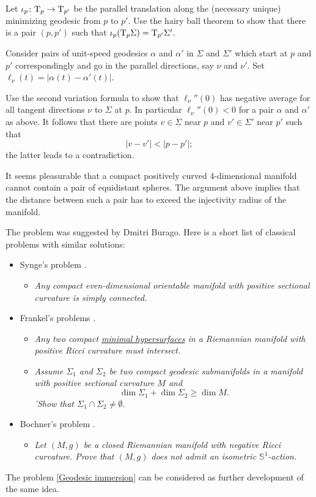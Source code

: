 Let $\iota_p\colon\mathrm{T}_p\to\mathrm{T}_{p'}$ be the parallel translation along the (necessary unique) minimizing geodesic from $p$ to $p'$.
Use the hairy ball theorem 
to show that there is a pair $(p,p')$ such that $\iota_p(\mathrm{T}_p\Sigma)=\mathrm{T}_{p'}\Sigma'$.

Consider pairs of unit-speed geodesics $\alpha$ and $\alpha'$ 
in $\Sigma$ and $\Sigma'$  
which start at $p$ and $p'$ correspondingly
and go in the parallel directions, say $\nu$ and $\nu'$. 
Set $\ell_\nu(t)=|\alpha(t)-\alpha'(t)|$.

Use the second variation formula to show that $\ell_\nu''(0)$ has negative average for all tangent directions $\nu$ to $\Sigma$ at $p$. 
In particular $\ell_\nu''(0)<0$ for a pair $\alpha$ and $\alpha'$ as above.
It follows that there are points $v\in\Sigma$ near $p$ 
and $v'\in\Sigma'$ near $p'$
such that 
\[|v-v'|<|p-p'|;\]
the latter leads to a contradiction.

It seems pleasurable that a 
compact 
positively curved 
4-dimensional manifold
cannot contain a pair of equidistant spheres.
The argument above implies that the distance between such a pair has to exceed the injectivity radius of the manifold.

{\sloppy 
The problem was suggested by Dmitri Burago.
Here is a short list of classical problems with similar solutions:
\begin{itemize}
\item Synge's problem \cite[see][]{synge}.
\begin{itemize}
 \item {\it Any compact even-dimensional orientable manifold with positive sectional curvature is
simply connected.}
\end{itemize}
\item Frankel's problems \cite[see][]{frankel}.
\begin{itemize}
\item {\it Any two compact \hyperref[Minimal surface]{\emph{minimal hypersurfaces}} in a Riemannian manifold with positive Ricci curvature must intersect.}
\item {\it Assume $\Sigma_1$ and $\Sigma_2$ be two compact geodesic submanifolds in a manifold with positive sectional curvature $M$ and \[\dim \Sigma_1+\dim \Sigma_2\ge \dim M.\] 'Show that $\Sigma_1\cap\Sigma_2\ne\emptyset$.}
\end{itemize}
\item Bochner's problem \cite[see][]{bochner}.
\begin{itemize}
\item{\it  Let $(M,g)$ be a closed Riemannian manifold with negative Ricci curvature.
Prove that $(M,g)$ does not admit an isometric $\mathbb{S}^1$-action.}
\end{itemize}
\end{itemize}
The problem \ref{Geodesic immersion} can be considered as further development of the same idea.

}


